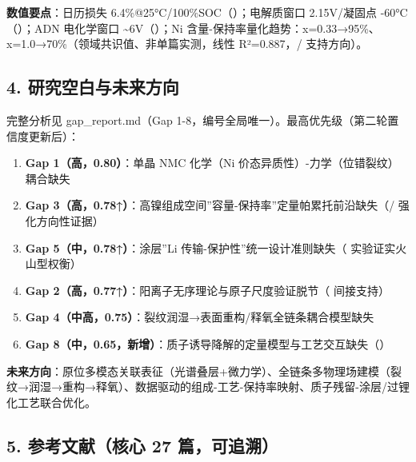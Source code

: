 \documentclass[12pt,a4paper]{ctexart}
\providecommand{\tightlist}{%
  \setlength{\itemsep}{0pt}\setlength{\parskip}{0pt}}
\begin{document}
\textbf{数值要点}：日历损失 6.4\%@25°C/100\%SOC（\cite{p16}）；电解质窗口 2.15V/凝固点 -60°C（\cite{p12}）；ADN 电化学窗口 \textasciitilde6V（\cite{p14}）；Ni 含量-保持率量化趋势：x=0.33→95\%、x=1.0→70\%（领域共识值、非单篇实测，线性 R²=0.887，\cite{p47}/\cite{p45} 支持方向）。

\subsection{4. 研究空白与未来方向}\label{ux7814ux7a76ux7a7aux767dux4e0eux672aux6765ux65b9ux5411}

完整分析见 gap\_report.md（Gap 1-8，编号全局唯一）。最高优先级（第二轮置信度更新后）：

\begin{enumerate}
\def\labelenumi{\arabic{enumi}.}
\tightlist
\item
  \textbf{Gap 1（高，0.80）}：单晶 NMC 化学（Ni 价态异质性）-力学（位错裂纹）耦合缺失
\item
  \textbf{Gap 3（高，0.78↑）}：高镍组成空间''容量-保持率''定量帕累托前沿缺失（\cite{p47}/\cite{p45} 强化方向性证据）
\item
  \textbf{Gap 5（中，0.78↑）}：涂层''Li 传输-保护性''统一设计准则缺失（\cite{p46} 实验证实火山型权衡）
\item
  \textbf{Gap 2（高，0.77↑）}：阳离子无序理论与原子尺度验证脱节（\cite{p44} 间接支持）
\item
  \textbf{Gap 4（中高，0.75）}：裂纹润湿→表面重构/释氧全链条耦合模型缺失
\item
  \textbf{Gap 8（中，0.65，新增）}：质子诱导降解的定量模型与工艺交互缺失（\cite{p48}）
\end{enumerate}

\textbf{未来方向}：原位多模态关联表征（光谱叠层+微力学）、全链条多物理场建模（裂纹→润湿→重构→释氧）、数据驱动的组成-工艺-保持率映射、质子残留-涂层/过锂化工艺联合优化。

\subsection{5. 参考文献（核心 27 篇，可追溯）}\label{ux53c2ux8003ux6587ux732eux6838ux5fc3-27-ux7bc7ux53efux8ffdux6eaf}
\end{document}

